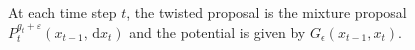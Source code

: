 \documentclass[11pt,reqno]{amsart}
\newcommand{\dd}{{\,\mathrm d}}
\theoremstyle{definition}
\begin{document}
At each time step $t$, the twisted proposal is the mixture proposal  $P_t^{g_t+\varepsilon}(x_{t-1}, \dd x_t)$ and the potential is given by $G_\epsilon(x_{t-1}, x_t)$. 

\end{document}

